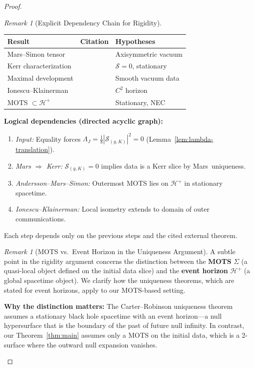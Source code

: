 \documentclass[12pt]{article}
\theoremstyle{plain}
\theoremstyle{definition}
\theoremstyle{remark}
\newtheorem{remark}[theorem]{Remark}
\begin{document}
\begin{proof}
\begin{remark}[Explicit Dependency Chain for Rigidity]
\begin{center}
\small
\begin{tabular}{@{}lll@{}}
\toprule
\textbf{Result} & \textbf{Citation} & \textbf{Hypotheses} \\
\midrule
Mars--Simon tensor & \cite{mars1999} & Axisymmetric vacuum \\
Kerr characterization & \cite{mars2009} & $\mathcal{S} = 0$, stationary \\
Maximal development & \cite{choquetbruhat1969} & Smooth vacuum data \\
Ionescu--Klainerman & \cite{ionescuklainerman2009} & $C^2$ horizon \\
MOTS $\subset \mathcal{H}^+$ & \cite{anderssonmarssimonfaller2008} & Stationary, NEC \\
\bottomrule
\end{tabular}
\end{center}

\textbf{Logical dependencies (directed acyclic graph):}
\begin{enumerate}
    \item[(L1)] \textit{Input:} Equality forces $\Lambda_J = \frac{1}{8}|\mathcal{S}_{(g,K)}|^2 = 0$ (Lemma~\ref{lem:lambda-translation}).
    \item[(L2)] \textit{Mars $\Rightarrow$ Kerr:} $\mathcal{S}_{(g,K)} = 0$ implies data is a Kerr slice by Mars~uniqueness.
    \item[(L3)] \textit{Andersson--Mars--Simon:} Outermost MOTS lies on $\mathcal{H}^+$ in stationary spacetime.
    \item[(L4)] \textit{Ionescu--Klainerman:} Local isometry extends to domain of outer communications.
\end{enumerate}
Each step depends only on the previous steps and the cited external theorem.
\end{remark}

\begin{remark}[MOTS vs.\ Event Horizon in the Uniqueness Argument]\label{rem:mots-vs-horizon}
A subtle point in the rigidity argument concerns the distinction between the \textbf{MOTS} $\Sigma$ (a quasi-local object defined on the initial data slice) and the \textbf{event horizon} $\mathcal{H}^+$ (a global spacetime object). We clarify how the uniqueness theorems, which are stated for event horizons, apply to our MOTS-based setting.

\textbf{Why the distinction matters:} The Carter--Robinson uniqueness theorem assumes a stationary black hole spacetime with an event horizon---a null hypersurface that is the boundary of the past of future null infinity. In contrast, our Theorem~\ref{thm:main} assumes only a MOTS on the initial data, which is a 2-surface where the outward null expansion vanishes.


\end{remark}
\end{proof}
\end{document}
